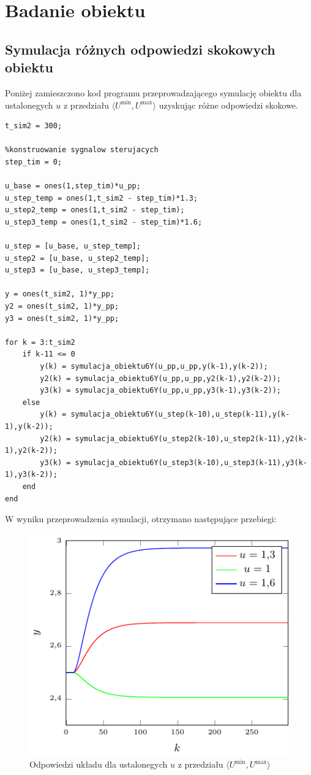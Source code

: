 \chapter{Badanie obiektu}
\section{Symulacja różnych odpowiedzi skokowych obiektu}

Poniżej zamieszczono kod programu przeprowadzającego symulację obiektu dla ustalonegych $u$  z przedziału $ \langle  U^{\textrm{min}}, U^{\textrm{max}}\rangle $ uzyskując różne odpowiedzi skokowe. 

\begin{lstlisting}[style=Matlab-editor, basicstyle=\tiny]
t_sim2 = 300;

%konstruowanie sygnalow sterujacych
step_tim = 0;

u_base = ones(1,step_tim)*u_pp;
u_step_temp = ones(1,t_sim2 - step_tim)*1.3;
u_step2_temp = ones(1,t_sim2 - step_tim);
u_step3_temp = ones(1,t_sim2 - step_tim)*1.6;

u_step = [u_base, u_step_temp];
u_step2 = [u_base, u_step2_temp];
u_step3 = [u_base, u_step3_temp];

y = ones(t_sim2, 1)*y_pp;
y2 = ones(t_sim2, 1)*y_pp;
y3 = ones(t_sim2, 1)*y_pp;

for k = 3:t_sim2
    if k-11 <= 0
        y(k) = symulacja_obiektu6Y(u_pp,u_pp,y(k-1),y(k-2));
        y2(k) = symulacja_obiektu6Y(u_pp,u_pp,y2(k-1),y2(k-2));
        y3(k) = symulacja_obiektu6Y(u_pp,u_pp,y3(k-1),y3(k-2));
    else
        y(k) = symulacja_obiektu6Y(u_step(k-10),u_step(k-11),y(k-1),y(k-2));
        y2(k) = symulacja_obiektu6Y(u_step2(k-10),u_step2(k-11),y2(k-1),y2(k-2));
        y3(k) = symulacja_obiektu6Y(u_step3(k-10),u_step3(k-11),y3(k-1),y3(k-2));      
    end
end
\end{lstlisting}

W wyniku przeprowadzenia symulacji, otrzymano następujące przebiegi:
\begin{figure}[h] 
\centering 
\includegraphics[scale=1.4]{wykresy/zad1_2/2_1.pdf} 
\caption{Odpowiedzi układu dla ustalonegych $u$  z przedziału $ \langle  U^{\textrm{min}}, U^{\textrm{max}}\rangle $ } 
\end{figure}


